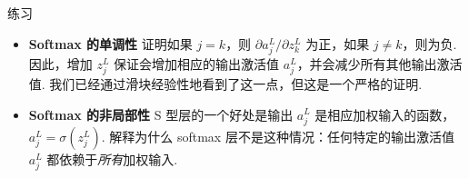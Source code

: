 \begin{exerciseBox}{练习}

\begin{itemize}

\item \textbf{Softmax 的单调性} 证明如果 $j = k$，则 $\partial a^L_j / \partial z^L_k$ 为正，如果 $j \neq k$，则为负. 因此，增加 $z^L_j$ 保证会增加相应的输出激活值 $a^L_j$，并会减少所有其他输出激活值. 我们已经通过滑块经验性地看到了这一点，但这是一个严格的证明.

\item \textbf{Softmax 的非局部性} S 型层的一个好处是输出 $a^L_j$ 是相应加权输入的函数，$a^L_j = \sigma(z^L_j)$. 解释为什么 softmax 层不是这种情况：任何特定的输出激活值 $a^L_j$ 都依赖于\emph{所有}加权输入.

\end{itemize}

\end{exerciseBox}


